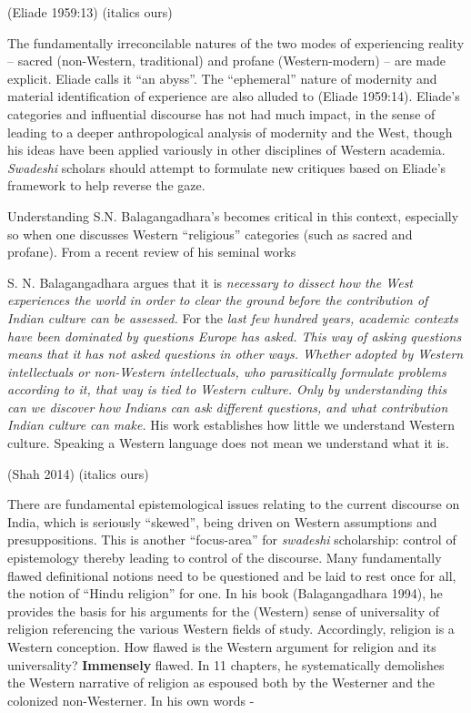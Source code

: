 \hfill (Eliade 1959:13) (italics ours)

The fundamentally irreconcilable natures of the two modes of experiencing reality – sacred (non-Western, traditional) and profane (Western-modern) – are made explicit. Eliade calls it “an abyss”. The “ephemeral” nature of modernity and material identification of experience are also alluded to (Eliade 1959:14). Eliade's categories and influential discourse has not had much impact, in the sense of leading to a deeper anthropological analysis of modernity and the West, though his ideas have been applied variously in other disciplines of Western academia. \textit{Swadeshi} scholars should attempt to formulate new critiques based on Eliade's framework to help reverse the gaze.

Understanding S.N. Balagangadhara's becomes critical in this context, especially so when one discusses Western “religious” categories (such as sacred and profane). From a recent review of his seminal works

\begin{myquote}
S. N. Balagangadhara argues that it is \textit{necessary to dissect how the West experiences the world in order to clear the ground before the contribution of Indian culture can be assessed.} For the \textit{last few hundred years, academic contexts have been dominated by questions Europe has asked. This way of asking questions means that it has not asked questions in other ways. Whether adopted by Western intellectuals or non-Western intellectuals, who parasitically formulate problems according to it, that way is tied to Western culture. Only by understanding this can we discover how Indians can ask different questions, and what contribution Indian culture can make.} His work establishes how little we understand Western culture. Speaking a Western language does not mean we understand what it is.
\end{myquote}

\hfill (Shah 2014) (italics ours)

There are fundamental epistemological issues relating to the current discourse on India, which is seriously “skewed”, being driven on Western assumptions and presuppositions. This is another “focus-area” for \textit{swadeshi} scholarship: control of epistemology thereby leading to control of the discourse. Many fundamentally flawed definitional notions need to be questioned and be laid to rest once for all, the notion of “Hindu religion” for one. In his book (Balagangadhara 1994), he provides the basis for his arguments for the (Western) sense of universality of religion referencing the various Western fields of study. Accordingly, religion is a Western conception. How flawed is the Western argument for religion and its universality? \textbf{Immensely} flawed. In 11 chapters, he systematically demolishes the Western narrative of religion as espoused both by the Westerner and the colonized non-Westerner. In his own words -

